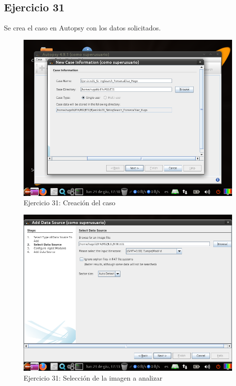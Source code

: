 \documentclass[11pt]{article}
\begin{document}
\subsection{Ejercicio 31}
Se crea el caso en Autopsy con los datos solicitados.

\begin{figure}[H]
    \caption{Ejercicio 31: Creación del caso}
  \centering
  \includegraphics[scale=0.7]{p02/e31-1.png}
\end{figure}

\begin{figure}[H]
    \caption{Ejercicio 31: Selección de la imagen a analizar}
  \centering
  \includegraphics[scale=0.7]{p02/e31-2.png}
\end{figure}
\end{document}
